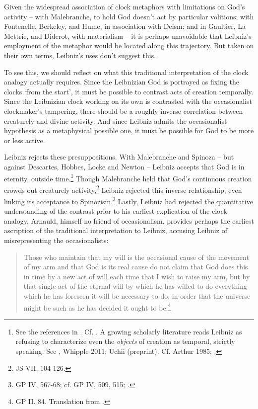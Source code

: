 \documentclass{article}
\begin{document}
Given the widespread association of clock metaphors with limitations on
God's activity -- with Malebranche, to hold God doesn't act by
particular volitions; with Fontenelle, Berkeley, and Hume, in
association with Deism; and in Gaultier, La Mettrie, and Diderot, with
materialism -- it is perhaps unavoidable that Leibniz's employment of
the metaphor would be located along this trajectory. But taken on their
own terms, Leibniz's uses don't suggest this.

To see this, we should reflect on what this traditional interpretation
of the clock analogy actually requires. Since the Leibnizian God is
portrayed as fixing the clocks `from the start', it must be possible to
contrast acts of creation temporally. Since the Leibnizian clock working
on its own is contrasted with the occasionalist clockmaker's tampering,
there should be a roughly inverse correlation between creaturely and
divine activity. And since Leibniz admits the occasionalist hypothesis
as a metaphysical possible one, it must be possible for God to be more
or less active.

Leibniz rejects these presuppositions. With Malebranche and Spinoza --
but against Descartes, Hobbes, Locke and Newton -- Leibniz accepts that
God is in eternity, outside time.\footnote{See the references in \autocite[414]{Gorham2008}. Cf. \autocite[250]{Jolley2002}. A growing scholarly literature reads
  Leibniz as refusing to characterize even the \emph{objects} of
  creation as temporal, strictly speaking. See \autocite{Whipple2010}, Whipple 2011; Uchii
  (preprint). Cf. Arthur 1985; \autocite{Lloyd2008}.} Though Malebranche held that
God's continuous creation crowds out creaturely activity,\footnote{JS
  VII, 104-126.} Leibniz rejected this inverse relationship, even
linking its acceptance to Spinozism.\footnote{GP IV, 567-68; cf. GP IV,
  509, 515; \autocite[318-320]{Bobro2008}.} Lastly, Leibniz had rejected the
quantitative understanding of the contrast prior to his earliest
explication of the clock analogy. Arnauld, himself no friend of
occasionalism, provides perhaps the earliest ascription of the
traditional interpretation to Leibniz, accusing Leibniz of
misrepresenting the occasionalists:

\begin{quote}
Those who maintain that my will is the occasional cause of the movement
of my arm and that God is its real cause do not claim that God does this
in time by a new act of will each time that I wish to raise my arm, but
by that single act of the eternal will by which he has willed to do
everything which he has foreseen it will be necessary to do, in order
that the universe might be such as he has decided it ought to
be.\footnote{GP II. 84. Translation from \autocite[246]{Jolley2002}.}
\end{quote}
\end{document}
